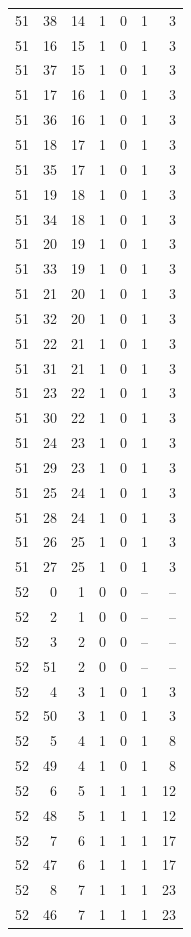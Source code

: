 \begin{longtable}{rrrrrrr}
51 & 38 & 14 & 1 & 0 & 1 & 3\\
51 & 16 & 15 & 1 & 0 & 1 & 3\\
51 & 37 & 15 & 1 & 0 & 1 & 3\\
51 & 17 & 16 & 1 & 0 & 1 & 3\\
51 & 36 & 16 & 1 & 0 & 1 & 3\\
51 & 18 & 17 & 1 & 0 & 1 & 3\\
51 & 35 & 17 & 1 & 0 & 1 & 3\\
51 & 19 & 18 & 1 & 0 & 1 & 3\\
51 & 34 & 18 & 1 & 0 & 1 & 3\\
51 & 20 & 19 & 1 & 0 & 1 & 3\\
51 & 33 & 19 & 1 & 0 & 1 & 3\\
51 & 21 & 20 & 1 & 0 & 1 & 3\\
51 & 32 & 20 & 1 & 0 & 1 & 3\\
51 & 22 & 21 & 1 & 0 & 1 & 3\\
51 & 31 & 21 & 1 & 0 & 1 & 3\\
51 & 23 & 22 & 1 & 0 & 1 & 3\\
51 & 30 & 22 & 1 & 0 & 1 & 3\\
51 & 24 & 23 & 1 & 0 & 1 & 3\\
51 & 29 & 23 & 1 & 0 & 1 & 3\\
51 & 25 & 24 & 1 & 0 & 1 & 3\\
51 & 28 & 24 & 1 & 0 & 1 & 3\\
51 & 26 & 25 & 1 & 0 & 1 & 3\\
51 & 27 & 25 & 1 & 0 & 1 & 3\\
52 & 0 & 1 & 0 & 0 & -- & --\\
52 & 2 & 1 & 0 & 0 & -- & --\\
52 & 3 & 2 & 0 & 0 & -- & --\\
52 & 51 & 2 & 0 & 0 & -- & --\\
52 & 4 & 3 & 1 & 0 & 1 & 3\\
52 & 50 & 3 & 1 & 0 & 1 & 3\\
52 & 5 & 4 & 1 & 0 & 1 & 8\\
52 & 49 & 4 & 1 & 0 & 1 & 8\\
52 & 6 & 5 & 1 & 1 & 1 & 12\\
52 & 48 & 5 & 1 & 1 & 1 & 12\\
52 & 7 & 6 & 1 & 1 & 1 & 17\\
52 & 47 & 6 & 1 & 1 & 1 & 17\\
52 & 8 & 7 & 1 & 1 & 1 & 23\\
52 & 46 & 7 & 1 & 1 & 1 & 23\\

\end{longtable}
